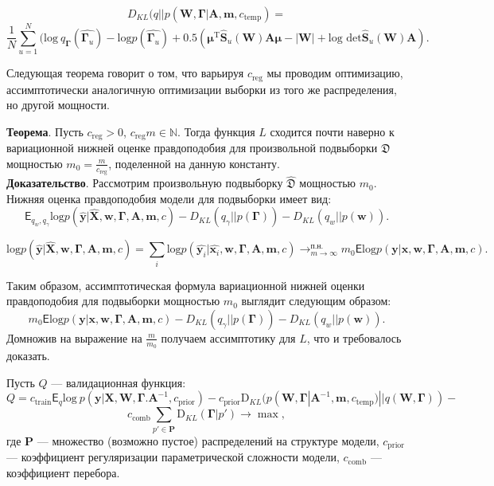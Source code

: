 \documentclass[12pt]{article}
\begin{document}
$$
   {D_{KL}}(q||p(\mathbf{W}, \boldsymbol{\Gamma}| \mathbf{A},\mathbf{m}, c_{\text{temp}}) = 
$$
$$
    \frac{1}{N}\sum_{u=1}^N (\text{log}~q_{\boldsymbol{\Gamma}}(\hat{\boldsymbol{\Gamma}_u}) - \text{log}p(\hat{\boldsymbol{\Gamma}_u}) + 0.5(\boldsymbol{\mu}^{\text{T}}\hat{\mathbf{S}}_u(\mathbf{W})\mathbf{A}\boldsymbol{\mu} - |\mathbf{W}| + \text{log det}\hat{\mathbf{S}}_u(\mathbf{W})\mathbf{A}).
$$

Следующая теорема говорит о том, что варьируя $c_{\text{reg}}$ мы проводим оптимизацию, ассимптотически аналогичную оптимизации выборки из того же распределения, но другой мощности.

\textbf{Теорема}. Пусть $c_{\text{reg}} > 0$, $c_{\text{reg}} m \in \mathbb{N}.$
Тогда функция $L$ сходится почти наверно к вариационной нижней оценке правдоподобия для произвольной подвыборки  $\mathfrak{D}$ 
мощностью $m_0 = \frac{m}{c_{\text{reg}}}$, поделенной на данную константу.\\

\textbf{Доказательство}. Рассмотрим произвольную подвыборку $\hat{\mathfrak{D}}$ мощностью $m_0$. Нижняя оценка правдоподобия модели для подвыборки имеет вид:
\[
 \mathsf{E}_{q_w,q_\gamma}\text{log} p(\hat{\mathbf{y}}|\hat{\mathbf{X}},\mathbf{w}, \boldsymbol{\Gamma}, \mathbf{A},\mathbf{m}, c) - {D_{KL}}(q_\gamma||p(\boldsymbol{\Gamma})) - {D_{KL}}(q_{w}||p(\mathbf{w})).
\]

\[
\text{log} p(\hat{\mathbf{y}}|\hat{\mathbf{X}},\mathbf{w}, \boldsymbol{\Gamma}, \mathbf{A},\mathbf{m}, c) = \sum_i \text{log} p(\hat{\mathbf{y}_i}|\hat{\mathbf{x}_i},\mathbf{w}, \boldsymbol{\Gamma}, \mathbf{A},\mathbf{m}, c) \to^{\text{п.н.}}_{m \to \infty} m_0\mathsf{E}\text{log} p(\mathbf{y}|{\mathbf{x}},\mathbf{w}, \boldsymbol{\Gamma}, \mathbf{A},\mathbf{m}, c).
\]

Таким образом, ассимптотическая формула вариационной нижней оценки правдоподобия для подвыборки мощностью $m_0$ выглядит следующим образом:
\[
m_0\mathsf{E}\text{log} p(\mathbf{y}|{\mathbf{x}},\mathbf{w}, \boldsymbol{\Gamma}, \mathbf{A},\mathbf{m}, c) - {D_{KL}}(q_\gamma||p(\boldsymbol{\Gamma})) - {D_{KL}}(q_{w}||p(\mathbf{w})).
\]
Домножив на выражение на $\frac{m}{m_0}$ получаем ассимптотику для $L$, что и требовалось доказать.

Пусть $Q$ --- валидационная функция:
\[
Q = {c_\text{train}\mathsf{E}_q \text{log}~{p(\mathbf{y} | \mathbf{X}, \mathbf{W}, \boldsymbol{\Gamma}. \mathbf{A}^{-1}, c_{\text{prior}})}}
 - {c_\text{prior}\text{D}_{KL}(p(\mathbf{W}, \boldsymbol{\Gamma} |\mathbf{A}^{-1}, \mathbf{m}, c_{\text{temp}}) || q(\mathbf{W}, \boldsymbol{\Gamma}))} -\]
\[
{c_{\text{comb}}\sum_{p' \in \mathbf{P}} \text{D}_{KL}(\boldsymbol{\Gamma} | p')} \to \max, 
\]
где $\mathbf{P}$ --- множество (возможно пустое) распределений на структуре модели, $c_\text{prior}$ --- коэффициент регуляризации параметрической сложности модели, 
$c_{\text{comb}}$ --- коэффициент перебора.
\end{document}
